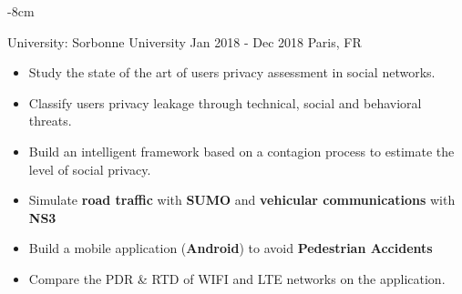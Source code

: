 \documentclass[10pt,a4paper]{.altacv}
\begin{document}

\begin{adjustwidth}{}{-8cm}
\makecvheader
\end{adjustwidth}


 {University: Sorbonne University} {Jan 2018 - Dec 2018} {Paris, FR}
\begin{itemize}
	\item Study the state of the art of users privacy assessment in social networks.
	\item Classify users privacy leakage through technical, social and behavioral threats.
	\item Build an intelligent framework based on a contagion process to estimate the level of social privacy.
\end{itemize}

\divider

\begin{itemize}
	\item Simulate \textbf {road traffic} with \textbf {SUMO} and \textbf {vehicular communications} with \textbf {NS3}
	\item Build a mobile application (\textbf {Android}) to avoid \textbf {Pedestrian Accidents}
	\item Compare the PDR \& RTD of WIFI and LTE networks on the application.
\end{itemize}
\end{document}
